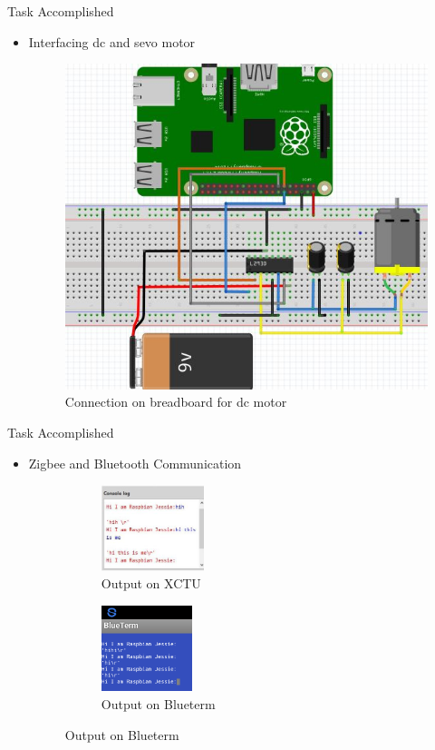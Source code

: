 \documentclass[10pt, a4paper]{beamer}
\begin{document}
\begin{frame}{Task Accomplished}
	\begin{itemize}
		\item Interfacing dc and sevo motor
		 \begin{figure}[h!]
		 \includegraphics[scale=0.3]{DC_motor_GPIO.jpg}
		 \centering
		 \caption{Connection on breadboard for dc motor}
		\end{figure}
	\end{itemize}
\end{frame}
\begin{frame}{Task Accomplished}
	\begin{itemize}
		\item Zigbee and Bluetooth Communication
		\begin{figure}[h!]
			\begin{subfigure}{0.5\textwidth}
				\includegraphics[width=0.7\linewidth,height=2.5cm]{Xctu1.jpg}
				\centering 
				\caption{Output on XCTU}
			\end{subfigure}
			\begin{subfigure}{0.5\textwidth}
				\includegraphics[width=0.6\linewidth,height=2.5cm]{Blueterm1.jpg}
				\centering
				\caption{Output on Blueterm}
			\end{subfigure}
		\end{figure}
	\end{itemize}
\end{frame}
\end{document}

